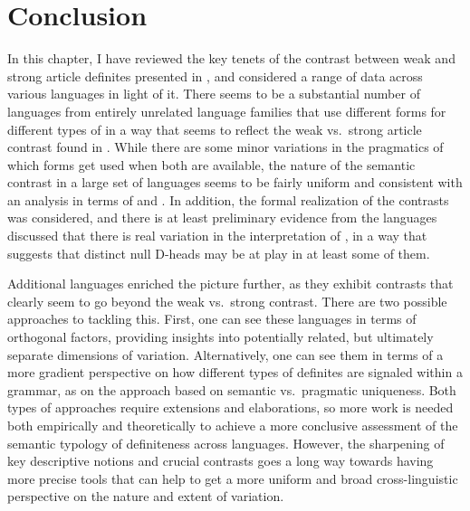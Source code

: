 \documentclass[output=paper
,modfonts
,nonflat]{langscibook}
\begin{document}
\section{Conclusion}

In this chapter, I have reviewed the key tenets of the contrast
between weak and strong article definites presented in
\citet{Schwarz2009}, and considered a range of data across various
languages in light of it. There seems to be a substantial number of
languages from entirely unrelated language families that use different
forms for different types of  in a way that seems
to reflect the weak vs.\ strong article contrast found in
. While there are some minor variations in the pragmatics of
which forms get used when both are available, the nature of the
semantic contrast in a large set of languages seems to be fairly
uniform and consistent with an analysis in terms of  and . In addition, the formal realization of
the contrasts was considered, and there is at least preliminary
evidence from the languages discussed that there is real variation in
the interpretation of , in a way that suggests that
distinct null D-heads may be at play in at least some of them.

Additional languages enriched the picture further, as they exhibit
contrasts that clearly seem to go beyond the weak vs.\ strong contrast. There are two
possible approaches to tackling this. First, one can see these
languages in terms of orthogonal factors, providing insights into
potentially related, but ultimately separate dimensions of
variation. Alternatively, one can see them in terms of a more gradient
perspective on how different types of definites are signaled within a
grammar, as on the approach based on semantic vs.\ pragmatic
uniqueness. Both types of approaches require extensions and
elaborations, so
more work is needed both empirically and theoretically to achieve a
more conclusive assessment of the semantic typology of definiteness
across languages. However, the sharpening of key descriptive notions
and crucial contrasts goes a long way towards having more precise tools
that can help to get a more uniform and broad cross-linguistic
perspective on the nature and extent of variation.

{\sloppy
\printbibliography[heading=subbibliography,notkeyword=this]
}
\end{document}

